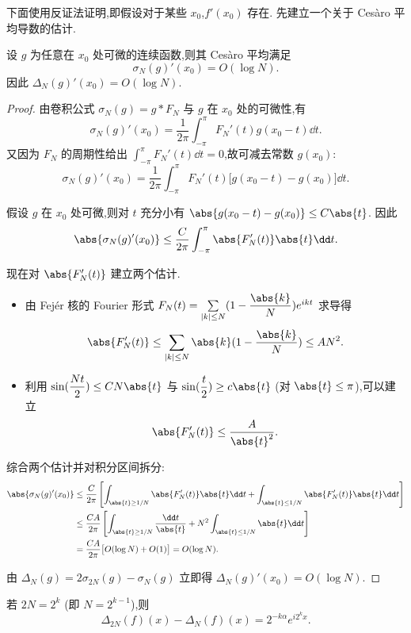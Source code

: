 下面使用反证法证明,即假设对于某些 $x_0$,$f'(x_0)$ 存在. 先建立一个关于 Cesàro 平均导数的估计.

\begin{lemma}
设 $g$ 为任意在 $x_0$ 处可微的连续函数,则其 Cesàro 平均满足
\[
\sigma_N(g)'(x_0)=O(\log N).
\]
因此 $\Delta_N(g)'(x_0)=O(\log N)$.
\label{Cesàro平均导数的对数增长}
\end{lemma}

\begin{proof}
由卷积公式 $\sigma_N(g)=g*F_N$ 与 $g$ 在 $x_0$ 处的可微性,有
\[
\sigma_N(g)'(x_0)
=\frac1{2\pi}\int_{-\pi}^{\pi}F_N'(t)g(x_0-t)\dd t.
\]
又因为 $F_N$ 的周期性给出 $\displaystyle\int_{-\pi}^{\pi}F_N'(t)\dd t=0$,故可减去常数 $g(x_0)$:
\[
\sigma_N(g)'(x_0)
=\frac1{2\pi}\int_{-\pi}^{\pi}F_N'(t)\bigl[g(x_0-t)-g(x_0)\bigr]\dd t.
\]

假设 $g$ 在 $x_0$ 处可微,则对 $t$ 充分小有 $\abs{g(x_0-t)-g(x_0)}\leq C\abs{t}$. 因此
\[
\abs{\sigma_N(g)'(x_0)}
\leq\frac C{2\pi}\int_{-\pi}^{\pi}\abs{F_N'(t)}\abs{t}\dd t.
\]

现在对 $\abs{F_N'(t)}$ 建立两个估计.
\begin{itemize}
\item 由 Fejér 核的 Fourier 形式 $F_N(t)=\sum\limits_{|k|\leq N}(1-\dfrac{\abs{k}}{N})e^{ikt}$ 求导得
\[
\abs{F_N'(t)}\leq\sum_{|k|\leq N}\abs{k}(1-\dfrac{\abs{k}}{N})\leq AN^2.
\]
\item 利用 $\sin(\dfrac{Nt}{2})\leq CN\abs{t}$ 与 $\sin(\dfrac t2)\geq c\abs{t}$ (对 $\abs{t}\leq\pi$),可以建立
\[
\abs{F_N'(t)}\leq\frac A{\abs{t}^2}.
\]
\end{itemize}

综合两个估计并对积分区间拆分:
\[
\begin{aligned}
\abs{\sigma_N(g)'(x_0)}
&\leq\frac C{2\pi}\left[\int_{\abs{t}\geq1/N}\abs{F_N'(t)}\abs{t}\dd t
+\int_{\abs{t}\leq1/N}\abs{F_N'(t)}\abs{t}\dd t\right]\\
&\leq\frac{CA}{2\pi}\left[\int_{\abs{t}\geq1/N}\frac{\dd t}{\abs{t}}
+N^2\int_{\abs{t}\leq1/N}\abs{t}\dd t\right]\\
&=\frac{CA}{2\pi}\bigl[O(\log N)+O(1)\bigr]=O(\log N).
\end{aligned}
\]

由 $\Delta_N(g)=2\sigma_{2N}(g)-\sigma_N(g)$ 立即得 $\Delta_N(g)'(x_0)=O(\log N)$.
\end{proof}

\begin{lemma}
若 $2N=2^k$ (即 $N=2^{k-1}$),则
\[
\Delta_{2N}(f)(x)-\Delta_N(f)(x)=2^{-k\alpha}e^{i2^k x}.
\]
\label{缺项Fourier级数的差分}
\end{lemma}

